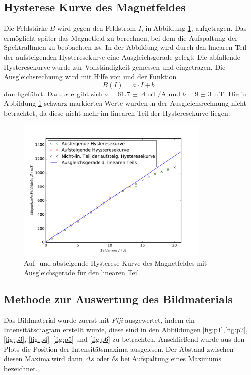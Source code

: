 \subsection{Hysterese Kurve des Magnetfeldes}
Die Feldstärke $B$ wird gegen den Feldstrom $I$, in Abbildung \ref{fig:BFeldplot}, aufgetragen. 
Das ermöglicht später das Magnetfeld zu berechnen, bei dem die Aufspaltung der Spektrallinien 
zu beobachten ist. In der Abbildung wird durch den linearen Teil der aufsteigenden Hysteresekurve eine 
Ausgleichsgerade gelegt. Die abfallende Hysteresekurve wurde zur Vollständigkeit gemessen und 
eingetragen. Die Ausgleichsrechnung wird mit Hilfe von \cite{scipy} und der Funktion
\begin{equation*}
B\left(I\right) = a \cdot I + b
\end{equation*}
durchgeführt.  Daraus ergibt sich $ a = \SI{61.7(4)}{\milli\tesla\per\ampere}$ und 
$ b = \SI{9(3)}{\milli\tesla}$. Die in Abbildung \ref{fig:BFeldplot} schwarz markierten Werte wurden 
in der Ausgleichsrechnung nicht betrachtet, da diese nicht mehr im linearen Teil der Hysteresekurve 
liegen.
\begin{figure}
  \centering
  \includegraphics[height = 7cm]{plots/BFeldplot.pdf}
  \caption{Auf- und absteigende Hysterese Kurve des Magnetfeldes mit Ausgleichsgerade für den linearen Teil.}
   \label{fig:BFeldplot}
\end{figure}
\FloatBarrier

\subsection{Methode zur Auswertung des Bildmaterials}
\label{sec:MB}
Das Bildmaterial wurde zuerst mit \textit{Fiji} \cite{fiji} ausgewertet, indem ein 
Intensitätsdiagram 
erstellt wurde, diese sind in den Abbildungen \ref{fig:p1},\ref{fig:p2}, \ref{fig:p3}, 
\ref{fig:p4}, \ref{fig:p5} und \ref{fig:p6} zu betrachten. Anschließend wurde aus den Plots die 
Position der Intensitätsmaxima ausgelesen. Der Abstand zwischen diesen Maxima wird dann $\Delta s$ 
oder $\delta s$ bei Aufspaltung eines Maximums bezeichnet.


